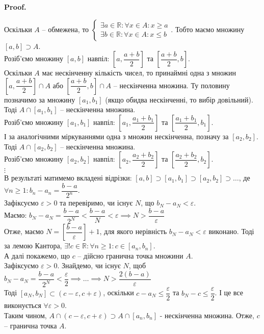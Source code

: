 \documentclass[a4paper, 14pt]{article}
\makeatletter
\def\qed{$\blacksquare$}
\theoremstyle{theoremdd}
\theoremstyle{theoremdd}
\theoremstyle{theoremdd}
\theoremstyle{theoremdd}
\theoremstyle{theoremdd}
\theoremstyle{theoremdd}
\theoremstyle{theoremdd}
\theoremstyle{theoremdd}
\renewenvironment{proof}[1][Proof.\\]{\par
\pushQED{\hfill \qed}%
\normalfont \topsep6\p@\@plus6\p@\relax
\trivlist
\item\relax
{\bfseries
#1\@addpunct{.}}\hspace\labelsep\ignorespaces
}{%
\popQED\endtrivlist\@endpefalse
}
\makeatother
\begin{document}
	\begin{proof}
	Оскільки $A$ -- обмежена, то
	$\begin{cases} \exists a \in \mathbb{R}: \forall x \in A: x \geq a \\
	  \exists b \in \mathbb{R}: \forall x \in A: x \leq b \end{cases}$. Тобто маємо множину $[a,b] \supset A$.\\
	Розіб'ємо множину $[a,b]$ навпіл: $\left[a, \dfrac{a+b}{2}\right]$ та $\left[\dfrac{a+b}{2},b \right]$.\\
	Оскільки $A$ має нескінченну кількість чисел, то принаймні одна з множин $\left[a, \dfrac{a+b}{2}\right] \cap A$ або $\left[\dfrac{a+b}{2}, b\right] \cap A$ -- нескінченна множина. Ту половину позначимо за множину $[a_1,b_1]$ (якщо обидва нескінченні, то вибір довільний). Тоді $A \cap [a_1,b_1]$ -- нескінченна множина.\\
	Розіб'ємо множину $[a_1,b_1]$ навпіл: $\left[a_1, \dfrac{a_1+b_1}{2}\right]$ та $\left[\dfrac{a_1+b_1}{2},b_1 \right]$.\\
	І за аналогічними міркуваннями одна з множин нескінченна, позначу за $[a_2,b_2]$. Тоді $A \cap [a_2,b_2]$ -- нескінченна множина.\\
	Розіб'ємо множину $[a_2,b_2]$ навпіл: $\left[a_2, \dfrac{a_2+b_2}{2}\right]$ та $\left[\dfrac{a_2+b_2}{2},b_2 \right]$.\\
	$\vdots$\\
	В результаті матимемо вкладені відрізки: $[a,b] \supset [a_1,b_1] \supset [a_2,b_2] \supset \dots$, де $\forall n \geq 1: b_n - a_n = \dfrac{b-a}{2^n}$.\\
	Зафіксуємо $\varepsilon > 0$ та перевіримо, чи існує $N$, що $b_N - a_N < \varepsilon$.\\
	Маємо: $b_N - a_N = \dfrac{b-a}{2^N} < \dfrac{b-a}{N} < \varepsilon \implies N > \dfrac{b-a}{\varepsilon}$\\
	Отже, маємо $N = \left[ \dfrac{b-a}{\varepsilon} \right]+1$, для якого нерівність $b_N-a_N < \varepsilon$ виконано. Тоді за лемою Кантора, $\exists! c \in \mathbb{R}: \forall n \geq 1: c \in [a_n,b_n]$.
	\bigskip \\
	А далі покажемо, що $c$ -- дійсно гранична точка множини $A$.\\
	Зафіксуємо $\varepsilon > 0$. Знайдемо, чи існує $N$, щоб $b_N - a_N = \dfrac{b-a}{2^N} < \dfrac{\varepsilon}{2} \implies \dots \implies N > \dfrac{2(b-a)}{\varepsilon}$\\
	Тоді $[a_N,b_N] \subset (c-\varepsilon, c+\varepsilon)$, оскільки $c-a_N \leq \dfrac{\varepsilon}{2}$ та $b_N -c \leq \dfrac{\varepsilon}{2}$. І це все виконується $\forall \varepsilon > 0$.\\
	Таким чином, $A \cap (c-\varepsilon, c+\varepsilon) \supset A \cap [a_n,b_n]$ - нескінченна множина. Отже, $c$ -- гранична точка $A$.
	\end{proof}
	
\end{document}

